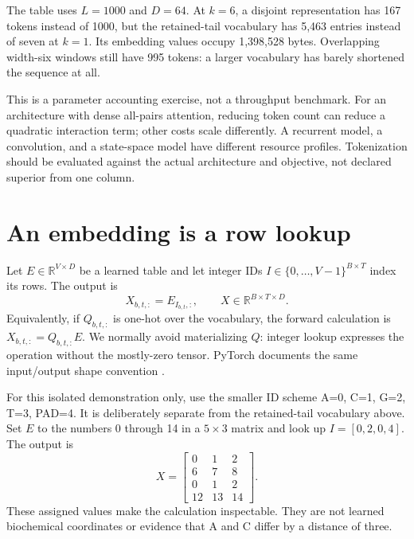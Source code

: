 \begin{center}\small\end{center}

The table uses $L=1000$ and $D=64$. At $k=6$, a disjoint representation
has 167 tokens instead of 1000, but the retained-tail vocabulary has 5,463
entries instead of seven at $k=1$. Its embedding values occupy 1,398,528
bytes. Overlapping width-six windows still have 995 tokens: a larger
vocabulary has barely shortened the sequence at all.

This is a parameter accounting exercise, not a throughput benchmark.
For an architecture with dense all-pairs attention, reducing token count
can reduce a quadratic interaction term; other costs scale differently.
A recurrent model, a convolution, and a state-space model have different
resource profiles. Tokenization should be evaluated against the actual
architecture and objective, not declared superior from one column.

\section{An embedding is a row lookup}

Let $E\in\mathbb{R}^{V\times D}$ be a learned table and let integer IDs
$I\in\{0,\ldots,V-1\}^{B\times T}$ index its rows. The output is
\begin{equation}
X_{b,t,:}=E_{I_{b,t},:},
\qquad X\in\mathbb{R}^{B\times T\times D}.
\label{eq:embedding}
\end{equation}
Equivalently, if $Q_{b,t,:}$ is one-hot over the vocabulary, the forward
calculation is $X_{b,t,:}=Q_{b,t,:}E$. We normally avoid materializing $Q$:
integer lookup expresses the operation without the mostly-zero tensor.
PyTorch documents the same input/output shape convention \cite{torch-embedding}.


For this isolated demonstration only, use the smaller ID scheme
A=0, C=1, G=2, T=3, PAD=4. It is deliberately separate from the retained-tail
vocabulary above. Set $E$ to the numbers 0 through 14 in a $5\times3$
matrix and look up $I=[0,2,0,4]$. The output is
\begin{equation}
X=
\begin{bmatrix}
0&1&2\\6&7&8\\0&1&2\\12&13&14
\end{bmatrix}.
\end{equation}
These assigned values make the calculation inspectable. They are not learned
biochemical coordinates or evidence that A and C differ by a distance of three.

